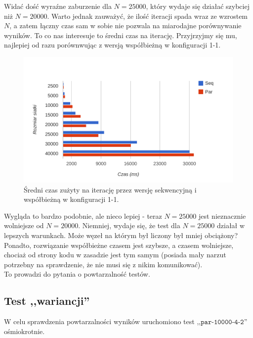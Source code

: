 \documentclass[paper=a4, fontsize=11pt]{scrartcl}	%
\numberwithin{equation}{section}		%
\numberwithin{figure}{section}			%
\numberwithin{table}{section}				%
\begin{document}
Widać dość wyraźne zaburzenie dla ${N=25000}$, który wydaje się działać szybciej
niż ${N=20000}$. Warto jednak zauważyć, że ilość iteracji spada wraz ze wzrostem
$N$, a zatem łączny czas sam w sobie nie pozwala na miarodajne porównywanie
wyników. To co nas interesuje to średni czas na iterację. Przyjrzyjmy się mu,
najlepiej od razu porównwując z wersją współbieżną w konfiguracji 1-1.

\begin{figure}[h]
  \centering
    \includegraphics{report/seq-time-norm.pdf}
  \caption{Średni czas zużyty na iterację przez wersję sekwencyjną\newline
           i współbieżną w konfiguracji 1-1.}
\end{figure}

Wygląda to bardzo podobnie, ale nieco lepiej - teraz ${N=25000}$ jest
nieznacznie wolniejsze od ${N=20000}$. Niemniej, wydaje się, że test dla
${N=25000}$ działał w lepszych warunkach. Może węzeł na którym był liczony był
mniej obciążony? Ponadto, rozwiązanie współbieżne czasem jest szybsze, a czasem
wolniejsze, chociaż od strony kodu w zasadzie jest tym samym (posiada mały
narzut potrzebny na sprawdzenie, że nie musi się z nikim komunikować). \\

To prowadzi do pytania o powtarzalność testów.



\subsection{Test ,,wariancji''}

W celu sprawdzenia powtarzalności wyników uruchomiono test
,,${\texttt{par-10000-4-2}}$'' ośmiokrotnie.
\end{document}
